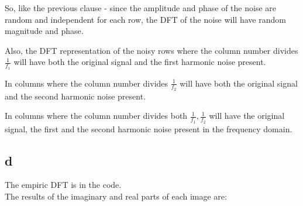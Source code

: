 \documentclass[english]{extarticle}
\numberwithin{equation}{section}
\numberwithin{figure}{section}
\begin{document}
So, like the previous clause - since the amplitude and phase of the noise are random and independent for each row, the DFT of the noise
will have random magnitude and phase.

Also, the DFT representation of the noisy rows where the column number divides $\frac{1}{f_1}$ will have both the original signal and the first harmonic noise present.

In columns where the column number divides $\frac{1}{f_2}$ will have both the original signal and the second harmonic noise present. 

In columns where the column number divides both $\frac{1}{f_1}, \frac{1}{f_2}$ will have the original signal, the first and the second harmonic noise present in the frequency domain.

\newpage

\subsection*{d}

The empiric DFT is in the code. \\
The results of the imaginary and real parts of each image are:
\end{document}
